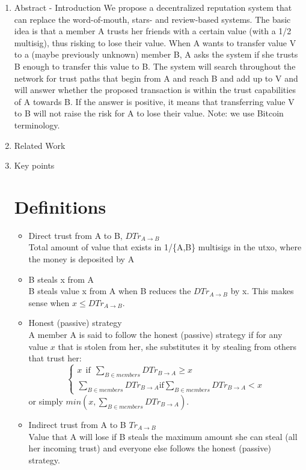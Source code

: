 \documentclass[11pt]{article}
\begin{document}
\begin{enumerate}
  \item Abstract - Introduction
  We propose a decentralized reputation system that can replace the word-of-mouth, stars- and review-based systems.
  The basic idea is that a member A trusts her friends with a certain value (with a 1/2 multisig), thus
  risking to lose their value. When A wants to transfer value V to a (maybe previously unknown) member B,
  A asks the system if she trusts B enough to transfer this value to B. The system will search throughout
  the network for trust paths that begin from A and reach B and add up to V and will answer whether the
  proposed transaction is within the trust capabilities of A towards B. If the answer is positive, it means
  that transferring value V to B will not raise the risk for A to lose their value.
  Note: we use Bitcoin terminology.


  \item Related Work

  \item Key points
  \section*{Definitions}
    \begin{itemize}
      \item Direct trust from A to B, $DTr_{A \rightarrow B}$ \\
      Total amount of value that exists in 1/\{A,B\} multisigs in the utxo, where the money is deposited by A
      \item B steals x from A \\
      B steals value x from A when B reduces the $DTr_{A \rightarrow B}$ by x. This makes sense when 
      $x \leq DTr_{A \rightarrow B}$.
      \item Honest (passive) strategy \\
      A member A is said to follow the honest (passive) strategy if for any value $x$ that is stolen from her, she
      substitutes it by stealing from others that trust her:
      \begin{equation*}\begin{cases}
          x\:\: \text{if} \:\:\sum_{B \in members}{DTr_{B \rightarrow A}} \geq x \\
         \sum_{B \in members}{DTr_{B \rightarrow A}} \text{if} \sum_{B \in members}{DTr_{B \rightarrow A}} < x
      \end{cases}\end{equation*}
      or simply $min(x,\sum_{B \in members}{DTr_{B \rightarrow A}})$.
      \item Indirect trust from A to B $Tr_{A \rightarrow B}$ \\
      Value that A will lose if B steals the maximum amount she can steal (all her incoming trust) and everyone
      else follows the honest (passive) strategy.
    \end{itemize}

\end{enumerate}
\end{document}
